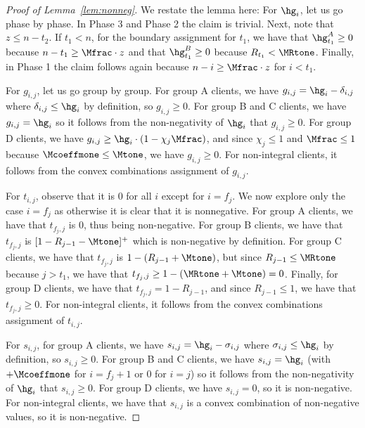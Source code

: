 \begin{proof}[Proof of Lemma~\ref{lem:nonneg}]
We restate the lemma here:
\lemnonneg*
For $\hg_i$, let us go phase by phase.
In Phase 3 and Phase 2 the claim is trivial.
Next, note that $z \leq n - t_2$.
If $t_1 < n$, for the boundary assignment for $t_1$, we have that $\hg_{t_1}^A \geq 0$ because $n - t_1 \geq \Mfrac \cdot z$ and that $\hg_{t_1}^B \geq 0$ because $R_{t_1} < \MRtone$. 
Finally, in Phase 1 the claim follows again because $n - i \geq \Mfrac \cdot z$ for $i < t_1$.

For $g_{i,j}$, let us go group by group.
For group A clients, we have $g_{i,j} = \hg_i - \delta_{i,j}$ where $\delta_{i,j} \leq \hg_i$ by definition, so $g_{i,j} \geq 0$. For group B and C clients, we have $g_{i,j} = \hg_i$ so it follows from the non-negativity of $\hg_i$ that $g_{i,j} \geq 0$. For group D clients, we have $g_{i,j} \geq \hg_i\cdot(1 - \chi_j \Mfrac)$, and since $\chi_j \leq 1$ and $\Mfrac \leq 1$ because $\Mcoeffmone \leq \Mtone$, we have $g_{i,j} \geq 0$.
For non-integral clients, it follows from the convex combinations assignment of $g_{i,j}$.

For $t_{i,j}$, observe that it is $0$ for all $i$ except for $i=f_j$. We now explore only the case $i=f_j$ as otherwise it is clear that it is nonnegative. For group A clients, we have that $t_{f_j,j}$ is $0$, thus being non-negative. For group B clients, we have that $t_{f_j,j}$ is $[1-R_{j-1}-\Mtone]^+$ which is non-negative by definition. For group C clients, we have that $t_{f_j,j}$ is $1 - (R_{j-1}+\Mtone)$, but since $R_{j-1} \leq \MRtone$ because $j > t_1$, we have that $t_{f_j,j} \geq 1 - (\MRtone + \Mtone) = 0$.
Finally, for group D clients, we have that $t_{f_j,j} = 1-R_{j-1}$, and since $R_{j-1} \leq 1$, we have that $t_{f_j,j} \geq 0$.
For non-integral clients, it follows from the convex combinations assignment of $t_{i,j}$.

For $s_{i,j}$, for group A clients, we have $s_{i,j} = \hg_i - \sigma_{i,j}$ where $\sigma_{i,j} \leq \hg_i$ by definition, so $s_{i,j} \geq 0$. For group B and C clients, we have $s_{i,j} = \hg_i$ (with $+\Mcoeffmone$ for $i=f_j+1$ or $0$ for $i=j$) so it follows from the non-negativity of $\hg_i$ that $s_{i,j} \geq 0$. For group D clients, we have $s_{i,j} = 0$, so it is non-negative.
For non-integral clients, we have that $s_{i,j}$ is a convex combination of non-negative values, so it is non-negative.
\end{proof}

